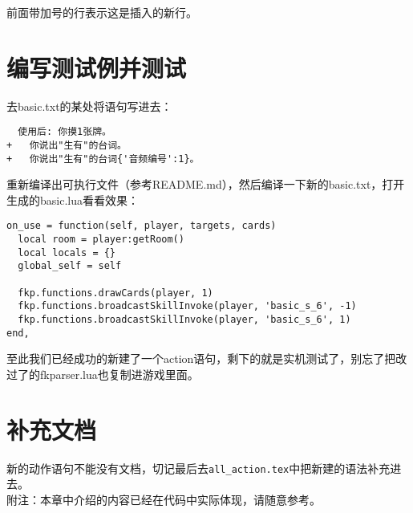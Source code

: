 前面带加号的行表示这是插入的新行。

\section{编写测试例并测试}

去basic.txt的某处将语句写进去：

\begin{verbatim}
  使用后: 你摸1张牌。
+   你说出"生有"的台词。
+   你说出"生有"的台词{'音频编号':1}。
\end{verbatim}

重新编译出可执行文件（参考README.md），然后编译一下新的basic.txt，打开生成的basic.lua看看效果：

\begin{verbatim}
on_use = function(self, player, targets, cards)
  local room = player:getRoom()
  local locals = {}
  global_self = self

  fkp.functions.drawCards(player, 1)
  fkp.functions.broadcastSkillInvoke(player, 'basic_s_6', -1)
  fkp.functions.broadcastSkillInvoke(player, 'basic_s_6', 1)
end,
\end{verbatim}

至此我们已经成功的新建了一个action语句，剩下的就是实机测试了，别忘了把改过了的fkparser.lua也复制进游戏里面。

\section{补充文档}

新的动作语句不能没有文档，切记最后去\verb|all_action.tex|中把新建的语法补充进去。\\

附注：本章中介绍的内容已经在代码中实际体现，请随意参考。

